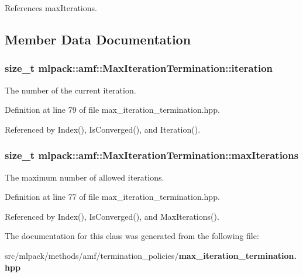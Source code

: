 References max\+Iterations.



\subsection{Member Data Documentation}
\subsubsection[{iteration}]{\setlength{\rightskip}{0pt plus 5cm}size\+\_\+t mlpack\+::amf\+::\+Max\+Iteration\+Termination\+::iteration\hspace{0.3cm}{\ttfamily [private]}}\label{classmlpack_1_1amf_1_1MaxIterationTermination_aca8e4588aa1c4fb147997c56fd35fc2b}


The number of the current iteration. 



Definition at line 79 of file max\+\_\+iteration\+\_\+termination.\+hpp.



Referenced by Index(), Is\+Converged(), and Iteration().

\subsubsection[{max\+Iterations}]{\setlength{\rightskip}{0pt plus 5cm}size\+\_\+t mlpack\+::amf\+::\+Max\+Iteration\+Termination\+::max\+Iterations\hspace{0.3cm}{\ttfamily [private]}}\label{classmlpack_1_1amf_1_1MaxIterationTermination_aef8a1de14b1d30ac6dcc2df5bb6ec970}


The maximum number of allowed iterations. 



Definition at line 77 of file max\+\_\+iteration\+\_\+termination.\+hpp.



Referenced by Index(), Is\+Converged(), and Max\+Iterations().



The documentation for this class was generated from the following file\+:\begin{DoxyCompactItemize}
\item 
src/mlpack/methods/amf/termination\+\_\+policies/{\bf max\+\_\+iteration\+\_\+termination.\+hpp}\end{DoxyCompactItemize}
